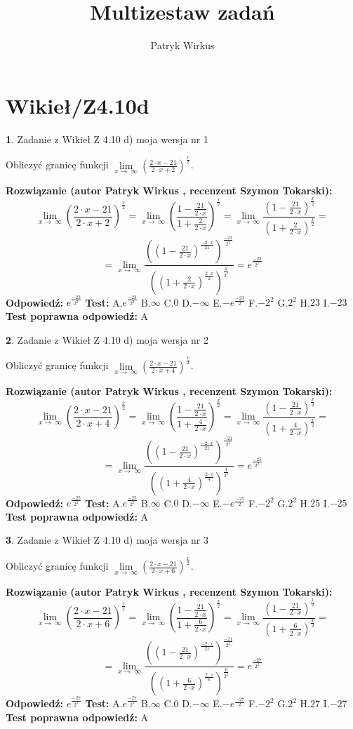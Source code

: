 \documentclass[12pt, a4paper]{article}
\title{Multizestaw zadań}
\author{Patryk Wirkus}
\date{}
\theoremstyle{definition} %
\newtheorem{zad}{}
\newcommand{\kategoria}[1]{\section{#1}}
\newcommand{\zadStart}[1]{\begin{zad}#1\newline}
\newcommand{\zadStop}{\end{zad}}
\newcommand{\rozwStart}[2]{\noindent \textbf{Rozwiązanie (autor #1 , recenzent #2): }\newline}
\newcommand{\rozwStop}{\newline}
\newcommand{\odpStart}{\noindent \textbf{Odpowiedź:}\newline}
\newcommand{\odpStop}{\newline}
\newcommand{\testStart}{\noindent \textbf{Test:}\newline}
\newcommand{\testStop}{\newline}
\newcommand{\kluczStart}{\noindent \textbf{Test poprawna odpowiedź:}\newline}
\newcommand{\kluczStop}{\newline}
\begin{document}
\maketitle

\kategoria{Wikieł/Z4.10d}


\zadStart{Zadanie z Wikieł Z 4.10 d) moja wersja nr 1}


Obliczyć granicę funkcji  $\lim\limits_{x\to\ \infty}(\frac{2\cdot x-21}{2\cdot x+2})^{\frac{x}{2}}$.
\zadStop
\rozwStart{Patryk Wirkus}{Szymon Tokarski}
$$\lim\limits_{x\to\ \infty}(\frac{2\cdot x-21}{2\cdot x+2})^{\frac{x}{2}} = \lim\limits_{x\to\ \infty}(\frac{1-\frac{21}{2\cdot x}}{1+\frac{2}{2\cdot x}})^{\frac{x}{2}}=\lim\limits_{x\to\ \infty}\frac{(1-\frac{21}{2\cdot x})^{\frac{x}{2}}}{(1+\frac{2}{2\cdot x})^{\frac{x}{2}}}=$$
$$=\lim\limits_{x\to\ \infty}\frac{((1-\frac{21}{2\cdot x})^{\frac{-2\cdot x}{21}})^{\frac{-21}{2^{2}}}}{((1+\frac{2}{2\cdot x})^{\frac{2\cdot x}{2}})^{\frac{2}{2^{2}}}}=e^{\frac{-23}{2^{2}}}$$
\rozwStop
\odpStart
$e^{\frac{-23}{2^{2}}}$
\odpStop
\testStart
A.$e^{\frac{-23}{2^{2}}}$ B.$\infty$ C.$0$ D.$-\infty$ E.$-e^{\frac{-23}{2}}$
F.$-2^{2}$ G.$2^{2}$
H.$23$
I.$-23$
\testStop
\kluczStart
A
\kluczStop



\zadStart{Zadanie z Wikieł Z 4.10 d) moja wersja nr 2}


Obliczyć granicę funkcji  $\lim\limits_{x\to\ \infty}(\frac{2\cdot x-21}{2\cdot x+4})^{\frac{x}{2}}$.
\zadStop
\rozwStart{Patryk Wirkus}{Szymon Tokarski}
$$\lim\limits_{x\to\ \infty}(\frac{2\cdot x-21}{2\cdot x+4})^{\frac{x}{2}} = \lim\limits_{x\to\ \infty}(\frac{1-\frac{21}{2\cdot x}}{1+\frac{4}{2\cdot x}})^{\frac{x}{2}}=\lim\limits_{x\to\ \infty}\frac{(1-\frac{21}{2\cdot x})^{\frac{x}{2}}}{(1+\frac{4}{2\cdot x})^{\frac{x}{2}}}=$$
$$=\lim\limits_{x\to\ \infty}\frac{((1-\frac{21}{2\cdot x})^{\frac{-2\cdot x}{21}})^{\frac{-21}{2^{2}}}}{((1+\frac{4}{2\cdot x})^{\frac{2\cdot x}{4}})^{\frac{4}{2^{2}}}}=e^{\frac{-25}{2^{2}}}$$
\rozwStop
\odpStart
$e^{\frac{-25}{2^{2}}}$
\odpStop
\testStart
A.$e^{\frac{-25}{2^{2}}}$ B.$\infty$ C.$0$ D.$-\infty$ E.$-e^{\frac{-25}{2}}$
F.$-2^{2}$ G.$2^{2}$
H.$25$
I.$-25$
\testStop
\kluczStart
A
\kluczStop



\zadStart{Zadanie z Wikieł Z 4.10 d) moja wersja nr 3}


Obliczyć granicę funkcji  $\lim\limits_{x\to\ \infty}(\frac{2\cdot x-21}{2\cdot x+6})^{\frac{x}{2}}$.
\zadStop
\rozwStart{Patryk Wirkus}{Szymon Tokarski}
$$\lim\limits_{x\to\ \infty}(\frac{2\cdot x-21}{2\cdot x+6})^{\frac{x}{2}} = \lim\limits_{x\to\ \infty}(\frac{1-\frac{21}{2\cdot x}}{1+\frac{6}{2\cdot x}})^{\frac{x}{2}}=\lim\limits_{x\to\ \infty}\frac{(1-\frac{21}{2\cdot x})^{\frac{x}{2}}}{(1+\frac{6}{2\cdot x})^{\frac{x}{2}}}=$$
$$=\lim\limits_{x\to\ \infty}\frac{((1-\frac{21}{2\cdot x})^{\frac{-2\cdot x}{21}})^{\frac{-21}{2^{2}}}}{((1+\frac{6}{2\cdot x})^{\frac{2\cdot x}{6}})^{\frac{6}{2^{2}}}}=e^{\frac{-27}{2^{2}}}$$
\rozwStop
\odpStart
$e^{\frac{-27}{2^{2}}}$
\odpStop
\testStart
A.$e^{\frac{-27}{2^{2}}}$ B.$\infty$ C.$0$ D.$-\infty$ E.$-e^{\frac{-27}{2}}$
F.$-2^{2}$ G.$2^{2}$
H.$27$
I.$-27$
\testStop
\kluczStart
A
\kluczStop
\end{document}
